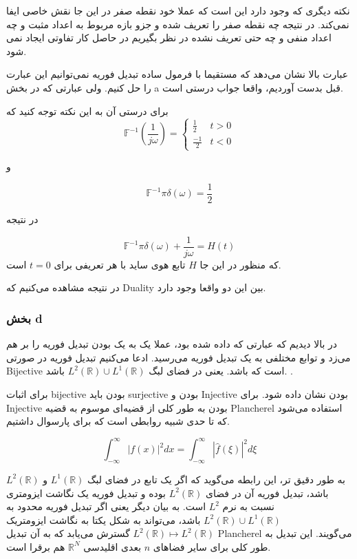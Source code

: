 \documentclass[12pt]{article}
\begin{document}
نکته دیگری که وجود دارد این است که عملا خود نقطه صفر در این جا نقش خاصی ایفا نمی‌کند. در نتیجه چه نقطه صفر را تعریف شده و جزو بازه مربوط به اعداد مثبت و چه اعداد منفی و چه حتی تعریف نشده در نظر بگیریم در حاصل کار تفاوتی ایجاد نمی شود.

عبارت بالا نشان می‌دهد که مستقیما با فرمول ساده تبدیل فوریه نمی‌توانیم این عبارت را حل کنیم. ولی عبارتی که در بخش a قبل بدست آوردیم،‌ واقعا جواب درستی است.

برای درستی آن به این نکته توجه کنید که
$$\mathbb{F}^{-1} (\frac{1}{j\omega}) = \left\{\begin{array}{ll}
	\frac{1}{2} & t > 0 \\
	\frac{-1}{2} & t<0
\end{array}\right.$$

و

$$\mathbb{F}^{-1}{\pi \delta(\omega) } = \frac{1}{2}$$

در نتیجه

$$\mathbb{F}^{-1}{\pi \delta(\omega) + \frac{1}{j\omega}} = H(t)$$
که منظور در این جا $H$ تابع هوی ساید با هر تعریفی برای $t=0$ است.

در نتیجه مشاهده می‌کنیم که Duality بین این دو واقعا وجود دارد.


\subsubsection{بخش d}


در بالا دیدیم که عبارتی که داده شده بود، عملا یک به یک بودن تبدیل فوریه را بر هم می‌زد و توابع مختلفی به یک تبدیل فوریه می‌رسید. ادعا می‌کنیم تبدیل فوریه در صورتی Bijective است که  باشد. یعنی در فضای
 لبگ
  $L^2(\mathbb{R}) \cup L^1(\mathbb{R})$
   باشد.
 .

 

برای اثبات bijective بودن باید surjective بودن و Injective بودن نشان داده شود. برای Injective بودن به طور کلی از قضیه‌ای موسوم به قضیه Plancherel استفاده می‌شود که تا حدی شبیه روابطی است که برای پارسوال داشتیم.


$$
\int_{-\infty}^{\infty}|f(x)|^{2} d x=\int_{-\infty}^{\infty}|\widehat{f}(\xi)|^{2} d \xi
$$

به طور دقیق تر، این رابطه می‌گوید که اگر یک تابع در فضای لبگ $L^1(\mathbb{R})$ و $L^2(\mathbb{R})$ باشد، تبدیل فوریه آن در فضای 
$L^2(\mathbb{R})$
بوده و تبدیل فوریه یک نگاشت ایزومتری نسبت به نرم $L^2$ است. به بیان دیگر یعنی اگر تبدیل فوریه محدود به
 $L^2(\mathbb{R}) \cup L^1(\mathbb{R})$
 باشد، می‌تواند به شکل یکتا به نگاشت ایزومتریک 
 $
 L^{2}(\mathbb{R}) \mapsto L^{2}(\mathbb{R})
 $
 گسترش می‌یابد که به آن تبدیل Plancherel می‌گویند. این تبدیل به طور کلی برای سایر فضاهای $n$ بعدی اقلیدسی $\mathbb{R}^N$ هم برقرا است.
 
\end{document}
